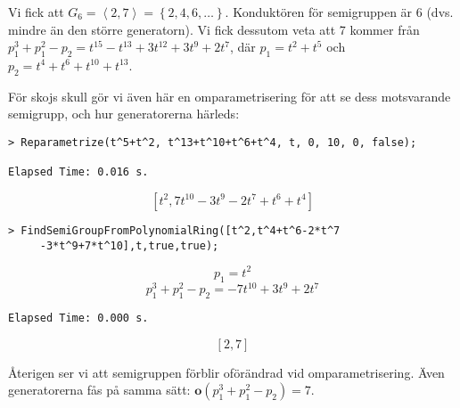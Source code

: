 Vi fick att $G_6 = \left<2, 7\right>=\left\{2, 4, 6,\ldots\right\}$. Konduktören för semigruppen är 6 (dvs. mindre än den större generatorn). Vi fick dessutom veta att 7 kommer från $p_1^3 + p_1^2 - p_2 = t^{15} - t^{13} + 3 t^{12} + 3 t^9 + 2 t^7$, där $p_1 = t^2 + t^5$ och $p_2 = t^4 + t^6 + t^{10} + t^{13}$.

För skojs skull gör vi även här en omparametrisering för att se dess motsvarande semigrupp, och hur generatorerna härleds:

\begin{verbatim}
> Reparametrize(t^5+t^2, t^13+t^10+t^6+t^4, t, 0, 10, 0, false);

Elapsed Time: 0.016 s.
\end{verbatim}
\[\left[t^2,7t^{10}-3t^9-2t^7+t^6+t^4\right]\]

\begin{verbatim}
> FindSemiGroupFromPolynomialRing([t^2,t^4+t^6-2*t^7
     -3*t^9+7*t^10],t,true,true);
\end{verbatim}
\[p_1 = t^2\]
\[p_1^3 + p_1^2 - p_2 = -7 t^{10} + 3 t^9 + 2 t^7\]
\begin{verbatim}
Elapsed Time: 0.000 s.
\end{verbatim}
\[\left[2, 7\right]\]

Återigen ser vi att semigruppen förblir oförändrad vid omparametrisering. Även generatorerna fås på samma sätt: $\mathbf{o}\left(p_1^3 + p_1^2 - p_2\right) = 7$.
